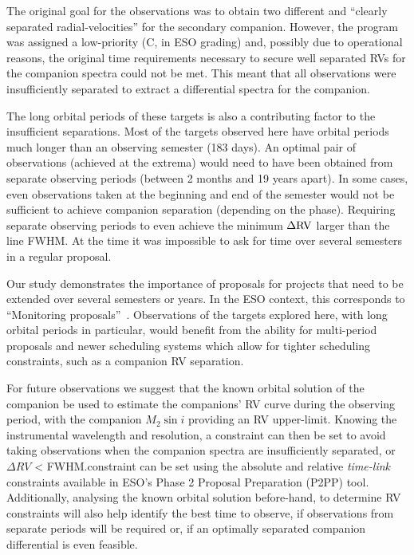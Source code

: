 The original goal for the observations was to obtain two different and ``clearly separated radial-velocities'' for the secondary companion.
However, the program was assigned a low-priority (C, in ESO grading) and, possibly due to operational reasons, the original time requirements necessary to secure well separated RVs for the companion spectra could not be met.
This meant that all observations were insufficiently separated to extract a differential spectra for the companion.

The long orbital periods of these targets is also a contributing factor to the insufficient separations.
Most of the targets observed here have orbital periods much longer than an observing semester (183 days).
An optimal pair of observations (achieved at the extrema) would need to have been obtained from separate observing periods (between 2 months and 19 years apart).
In some cases, even observations taken at the beginning and end of the semester would not be sufficient to achieve companion separation (depending on the phase).
Requiring separate observing periods to even achieve the minimum \(\Delta \rm {RV}\) larger than the line {FWHM}.
At the time it was impossible to ask for time over several semesters in a regular proposal.

Our study demonstrates the importance of proposals for projects that need to be extended over several semesters or years. In the ESO context, this corresponds to ``Monitoring proposals''~\citep[e.g.,][pg. 18]{eso_eso_2017}.
Observations of the targets explored here, with long orbital periods in particular, would benefit from the ability for multi-period proposals and newer scheduling systems which allow for tighter scheduling constraints, such as a companion {RV} separation.

For future observations we suggest that the known orbital solution of the companion be used to estimate the companions' {RV} curve during the observing period, with the companion \(M_2\sin{i}\) providing an {RV} upper-limit.
Knowing the instrumental wavelength and resolution, a constraint can then be set to avoid taking observations when the companion spectra are insufficiently separated, or \(\Delta {RV}\) < {FWHM}.\@This constraint can be set using the absolute and relative \emph{time-link} constraints available in {ESO}'s {Phase 2 Proposal Preparation} (P2PP) tool.
Additionally, analysing the known orbital solution before-hand, to determine {RV} constraints will also help identify the best time to observe, if observations from separate periods will be required or, if an optimally separated companion differential is even feasible.


